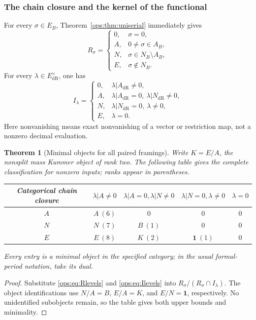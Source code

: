 \documentclass[11pt,a4paper,oneside]{article}
\theoremstyle{plain}
\newtheorem{theorem}{Theorem}[section]
\theoremstyle{definition}
\theoremstyle{remark}
\newcommand{\dR}{\mathrm{dR}}
\numberwithin{equation}{section}
\begin{document}
\subsubsection{The chain closure and the kernel of the functional}
For every $\sigma\in E_B$, Theorem~\ref{ops:thm:uniserial} immediately gives
\begin{equation}\label{ops:eq:Rlevels}
 R_\sigma=
 \begin{cases}
 0,&\sigma=0,\\
 A,&0\ne\sigma\in A_B,\\
 N,&\sigma\in N_B\setminus A_B,\\
 E,&\sigma\notin N_B.
 \end{cases}
\end{equation}
For every $\lambda\in E_{\dR}^{\vee}$, one has
\begin{equation}\label{ops:eq:Ilevels}
 I_\lambda=
 \begin{cases}
 0,&\lambda|A_{\dR}\ne0,\\
 A,&\lambda|A_{\dR}=0,\ \lambda|N_{\dR}\ne0,\\
 N,&\lambda|N_{\dR}=0,\ \lambda\ne0,\\
 E,&\lambda=0.
 \end{cases}
\end{equation}
Here nonvanishing means exact nonvanishing of a vector or restriction map, not a nonzero decimal evaluation.

\begin{theorem}[Minimal objects for all paired framings]\label{ops:thm:allframes}
Write $K=E/A$, the nonsplit mass Kummer object of rank two.
The following table gives the complete classification for nonzero inputs; ranks appear in parentheses.
\begin{center}
\small
\begin{tabular}{c|cccc}
\toprule
Categorical chain closure&$\lambda|A\ne0$
 &$\lambda|A=0,\lambda|N\ne0$
 &$\lambda|N=0,\lambda\ne0$&$\lambda=0$\\
\midrule
$A$&$A\ (6)$&$0$&$0$&$0$\\
$N$&$N\ (7)$&$B\ (1)$&$0$&$0$\\
$E$&$E\ (8)$&$K\ (2)$&$\mathbf1\ (1)$&$0$\\
\bottomrule
\end{tabular}
\end{center}
Every entry is a minimal object in the specified category; in the usual formal-period notation, take its dual.
\end{theorem}
\begin{proof}
Substitute \eqref{ops:eq:Rlevels} and \eqref{ops:eq:Ilevels} into
$R_\sigma/(R_\sigma\cap I_\lambda)$.
The object identifications use $N/A=B$, $E/A=K$, and $E/N=\mathbf1$, respectively.
No unidentified subobjects remain, so the table gives both upper bounds and minimality.
\end{proof}
\end{document}
